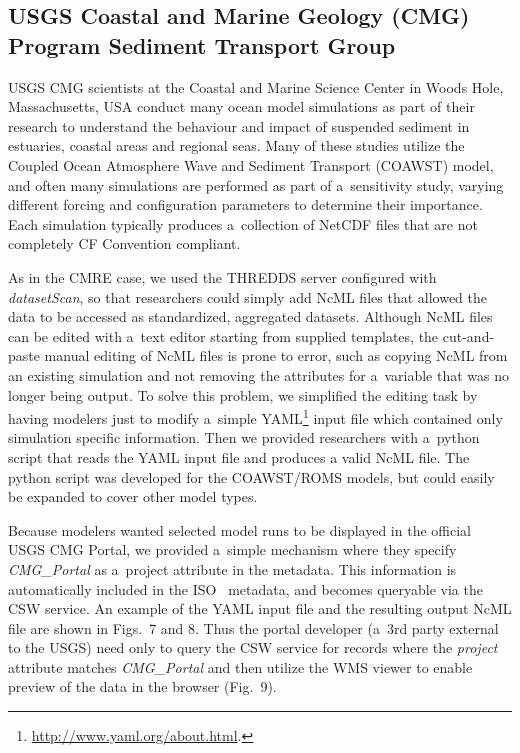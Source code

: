 \documentclass[osd, online, hvmath]{copernicus}
\begin{document}
\subsection{USGS Coastal and Marine Geology (CMG) Program Sediment Transport
  Group}

USGS CMG scientists at the Coastal and
Marine Science Center in Woods Hole, Massachusetts, USA conduct many ocean model
simulations as part of their research to understand the behaviour and
impact of suspended sediment in estuaries, coastal areas and regional
seas. Many of these studies utilize the Coupled Ocean Atmosphere Wave
and Sediment Transport (COAWST) model, and often many simulations are
performed as part of a~sensitivity study, varying different forcing
and configuration parameters to determine their importance. Each
simulation typically produces a~collection of NetCDF files that are
not completely CF Convention compliant.

As in the CMRE case, we used the THREDDS server configured with
\textit{datasetScan}, so that researchers could simply add NcML files
that allowed the data to be accessed as standardized, aggregated
datasets. Although NcML files can be edited with a~text editor
starting from supplied templates, the cut-and-paste manual editing of
NcML files is prone to error, such as copying NcML from an existing
simulation and not removing the attributes for a~variable that
was no longer being output. To solve this problem, we simplified the
editing task by having modelers just to modify a~simple YAML\footnote{\url{http://www.yaml.org/about.html}.} input file which contained only simulation
specific information. Then we provided researchers with a~python
script that reads the YAML input file and produces a valid NcML file. The python script
was developed for the COAWST/ROMS models, but could easily be expanded
to cover other model types.

Because modelers wanted selected model runs to be displayed in the
official USGS CMG Portal, we provided a~simple mechanism where they
specify \textit{CMG\_Portal} as a~project attribute in the
metadata. This information is automatically included in the ISO~
metadata, and becomes queryable via the CSW service. An example of the
YAML input file and the resulting output NcML file are shown in
Figs.~7 and 8. Thus the portal developer (a~3rd party external to the
USGS) need only to query the CSW service for records where the
\textit{project} attribute matches \textit{CMG\_Portal} and then
utilize the WMS 
viewer to enable preview of the data in the browser
(Fig.~9).
\end{document}
